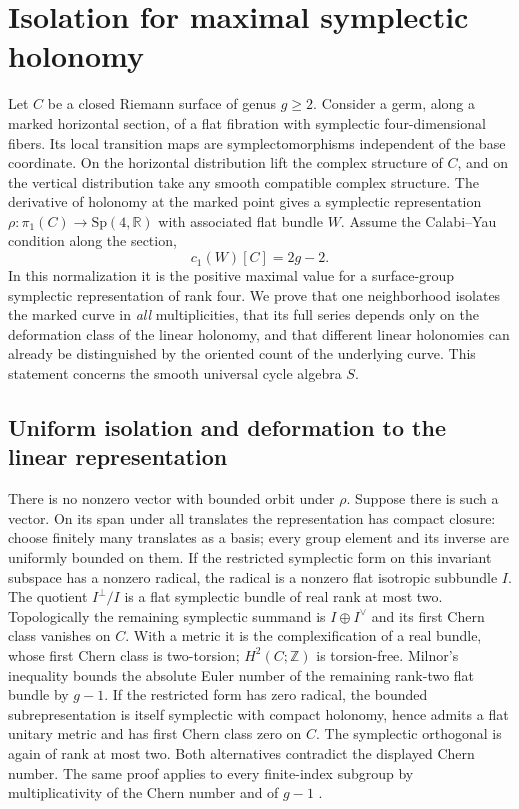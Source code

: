 \section{Isolation for maximal symplectic holonomy}\label{sec:maximal}
Let \(C\) be a closed Riemann surface of genus \(g\ge2\). Consider a germ, along a marked horizontal section, of a flat fibration with symplectic four-dimensional fibers. Its local transition maps are symplectomorphisms independent of the base coordinate. On the horizontal distribution lift the complex structure of \(C\), and on the vertical distribution take any smooth compatible complex structure. The derivative of holonomy at the marked point gives a symplectic representation \(\rho:\pi_1(C)\to\mathrm{Sp}(4,\mathbb R)\) with associated flat bundle \(W\). Assume the Calabi--Yau condition along the section,
\[c_1(W)[C]=2g-2 .\]
In this normalization it is the positive maximal value for a surface-group symplectic representation of rank four. We prove that one neighborhood isolates the marked curve in \emph{all} multiplicities, that its full series depends only on the deformation class of the linear holonomy, and that different linear holonomies can already be distinguished by the oriented count of the underlying curve. This statement concerns the smooth universal cycle algebra \(S\).

\subsection{Uniform isolation and deformation to the linear representation}

There is no nonzero vector with bounded orbit under \(\rho\). Suppose there is such a vector. On its span under all translates the representation has compact closure: choose finitely many translates as a basis; every group element and its inverse are uniformly bounded on them. If the restricted symplectic form on this invariant subspace has a nonzero radical, the radical is a nonzero flat isotropic subbundle \(I\). The quotient \(I^\perp/I\) is a flat symplectic bundle of real rank at most two. Topologically the remaining symplectic summand is \(I\oplus I^\vee\) and its first Chern class vanishes on \(C\). With a metric it is the complexification of a real bundle, whose first Chern class is two-torsion; \(H^2(C;\mathbb Z)\) is torsion-free. Milnor's inequality bounds the absolute Euler number of the remaining rank-two flat bundle by \(g-1\). If the restricted form has zero radical, the bounded subrepresentation is itself symplectic with compact holonomy, hence admits a flat unitary metric and has first Chern class zero on \(C\). The symplectic orthogonal is again of rank at most two. Both alternatives contradict the displayed Chern number. The same proof applies to every finite-index subgroup by multiplicativity of the Chern number and of \(g-1\) \cite{milnor}.

